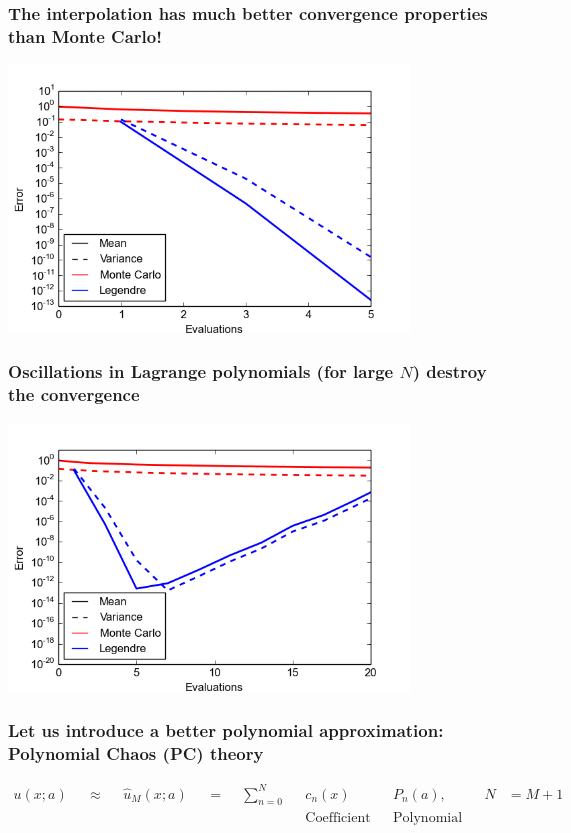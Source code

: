\documentclass{beamer}
\begin{document}
\begin{frame}
  \frametitle{The interpolation has much better convergence properties than Monte Carlo!}
  \begin{center}
    \includegraphics[width=0.8\textwidth]{MC_convergence_1D_2_short.png}
  \end{center}
\end{frame}

\begin{frame}
  \frametitle{Oscillations in Lagrange polynomials (for large $N$) destroy the convergence}
  \begin{center}
    \includegraphics[width=0.8\textwidth]{MC_convergence_1D_2.png}
  \end{center}
\end{frame}


\begin{frame}
  \frametitle{Let us introduce a better polynomial approximation: Polynomial Chaos (PC) theory}
  \begin{align*}
      u(x;a) & &\approx && \hat u_M(x;a) && =
      && \sum_{n=0}^N && c_n(x)\quad && P_n(a),\quad && N &= M+1\\
      &&  &&  &&  &&  && \text{Coefficient} && \text{Polynomial}
  \end{align*}
\end{frame}
\end{document}
